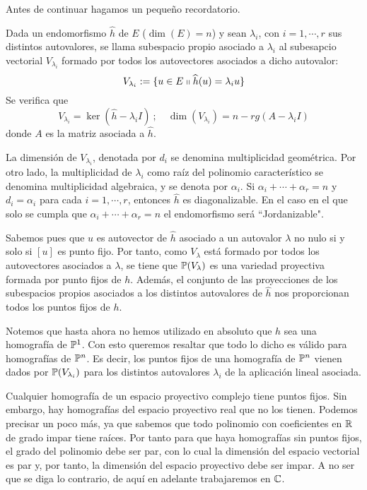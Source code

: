 Antes de continuar hagamos un pequeño recordatorio.

\begin{obs}
	Dada un endomorfismo $\widehat{h}$ de $E$ ($\dim(E)=n$) y sean $\lambda_i$, con $i=1,\cdots,r$ sus distintos autovalores, se llama subespacio propio asociado a $\lambda_i$ al subesapcio vectorial $V_{\lambda_i}$ formado por todos los autovectores asociados a dicho autovalor:
	\begin{equation}
		V_{\lambda_i}:=\{u\in E\shortparallel \widehat{h}(u)=\lambda_i u\}
	\end{equation}
	Se verifica que 
	\begin{equation}
		V_{\lambda_i}= \ker(\widehat{h}-\lambda_i I) \ ; \quad \dim(V_{\lambda_i})=n-rg(A-\lambda_i I)
	\end{equation}
	donde $A$ es la matriz asociada a $\widehat{h}$. 
	
	La dimensión de $V_{\lambda_i}$, denotada por $d_i$ se denomina multiplicidad geométrica. Por otro lado, la multiplicidad de $\lambda_i$ como raíz del polinomio característico se denomina multiplicidad algebraica, y se denota por $\alpha_i$. Si $\alpha_i+\cdots+\alpha_r=n$ y $d_i=\alpha_i$ para cada $i=1,\cdots,r$, entonces $\widehat{h}$ es diagonalizable. En el caso en el que solo se cumpla que $\alpha_i+\cdots+\alpha_r=n$ el endomorfismo será ``Jordanizable".
\end{obs}

Sabemos pues que $u$ es autovector de $\widehat{h}$ asociado a un autovalor $\lambda$ no nulo si y solo si $[u]$ es punto fijo. Por tanto, como $V_{\lambda}$ está formado por todos los autovectores asociados a $\lambda$, se tiene que $\mathbb{P}(V_\lambda)$ es una variedad proyectiva formada por punto fijos de $h$. Además, el conjunto de las proyecciones de los subespacios propios asociados a los distintos autovalores de $\widehat{h}$ nos proporcionan todos los puntos fijos de $h$.

Notemos que hasta ahora no hemos utilizado en absoluto que $h$ sea una homografía de $\mathbb{P}^1$. Con esto queremos resaltar que todo lo dicho es válido para homografías de $\mathbb{P}^n$. Es decir, los puntos fijos de una homografía de $\mathbb{P}^n$ vienen dados por $\mathbb{P}(V_{\lambda_i})$ para los distintos autovalores $\lambda_i$ de la aplicación lineal asociada.

\begin{obs}
	Cualquier homografía de un espacio proyectivo complejo tiene puntos fijos. Sin embargo, hay homografías del espacio proyectivo real que no los tienen. Podemos precisar un poco más, ya que sabemos que todo polinomio con coeficientes en $\mathbb{R}$ de grado impar tiene raíces. Por tanto para que haya homografías sin puntos fijos, el grado del polinomio debe ser par, con lo cual la dimensión del espacio vectorial es par y, por tanto, la dimensión del espacio proyectivo debe ser impar. A no ser que se diga lo contrario, de aquí en adelante trabajaremos en $\mathbb{C}$.
\end{obs}

